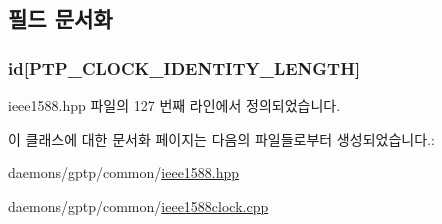 \subsection{필드 문서화}
\subsubsection[{\texorpdfstring{id}{id}}]{ id\mbox{[}{\bf P\+T\+P\+\_\+\+C\+L\+O\+C\+K\+\_\+\+I\+D\+E\+N\+T\+I\+T\+Y\+\_\+\+L\+E\+N\+G\+TH}\mbox{]}\hspace{0.3cm}{\ttfamily [private]}}\hypertarget{class_clock_identity_a8898dbdfcac5107567fdbf4878c140f9}{}\label{class_clock_identity_a8898dbdfcac5107567fdbf4878c140f9}


ieee1588.\+hpp 파일의 127 번째 라인에서 정의되었습니다.



이 클래스에 대한 문서화 페이지는 다음의 파일들로부터 생성되었습니다.\+:\begin{DoxyCompactItemize}
\item 
daemons/gptp/common/\hyperlink{ieee1588_8hpp}{ieee1588.\+hpp}\item 
daemons/gptp/common/\hyperlink{ieee1588clock_8cpp}{ieee1588clock.\+cpp}\end{DoxyCompactItemize}
